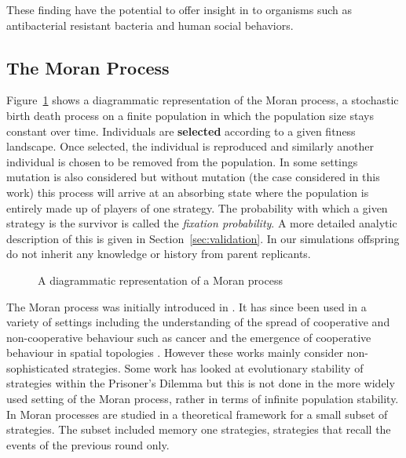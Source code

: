 \documentclass{article}
\begin{document}
These finding have the potential to offer insight in to organisms such as antibacterial
resistant bacteria \cite{Davies2010} and human social behaviors.

\subsection{The Moran Process}\label{sec:the_moran_process}

Figure~\ref{fig:moran_process} shows a diagrammatic representation of the Moran
process, a stochastic birth death process on a finite population in which the
population size stays constant over time. Individuals are \textbf{selected}
according to a given fitness landscape. Once selected, the individual is
reproduced and similarly another individual is chosen to be removed from the
population. In some settings mutation is also considered but without mutation
(the case considered in this work) this process will arrive at an absorbing
state where the population is entirely made up of players of one strategy. The
probability with which a given strategy is the survivor is called the
\textit{fixation probability}. A more detailed analytic description of this is
given in Section~\ref{sec:validation}. In our simulations offspring do not
inherit any knowledge or history from parent replicants.

\begin{figure}[!hbtp]
    \centering
    
    \caption{A diagrammatic representation of a Moran process}
    \label{fig:moran_process}
\end{figure}

The Moran process was initially introduced in \cite{Moran1957}. It has since
been used in a variety of settings including the understanding of the spread of
cooperative and non-cooperative behaviour such as cancer \cite{West2016} and the
emergence of cooperative behaviour in spatial topologies \cite{Nowak2017}.
However these works mainly consider non-sophisticated strategies. Some work has
looked at evolutionary stability of strategies within the Prisoner's Dilemma
\cite{Li2014} but this is not done in the more widely used setting of the Moran
process, rather in terms of infinite population stability. In \cite{Baek2016}
Moran processes are studied in a theoretical framework for a small subset of
strategies. The subset included memory one strategies, strategies that recall
the events of the previous round only.
\end{document}
